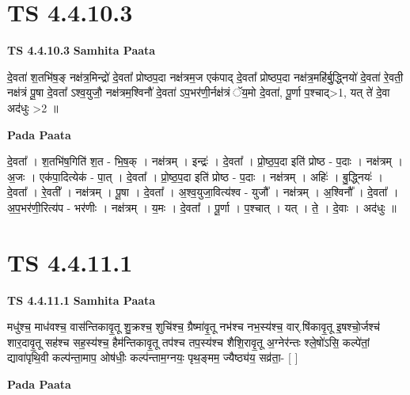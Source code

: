 \documentclass[17pt]{extarticle}
\begin{document}

\section{ TS 4.4.10.3 }

\textbf{TS 4.4.10.3 } \newline
\textbf{Samhita Paata} \newline

दे॒वता॑ श॒तभि॑ष॒ङ् नक्ष॑त्र॒मिन्द्रो॑ दे॒वता᳚ प्रोष्ठप॒दा नक्ष॑त्रम॒ज एक॑पाद् दे॒वता᳚ प्रोष्ठप॒दा नक्ष॑त्र॒महि॑र्बु॒द्ध्नियो॑ दे॒वता॑ रे॒वती॒ नक्ष॑त्रं पू॒षा दे॒वता᳚ ऽश्व॒युजौ॒ नक्ष॑त्रम॒श्विनौ॑ दे॒वता॑ ऽप॒भर॑णी॒र्नक्ष॑त्रं ॅय॒मो दे॒वता॑, पू॒र्णा प॒श्चाद्>1, यत् ते॑ दे॒वा अद॑धुः >2 ॥ \newline

\textbf{Pada Paata} \newline

दे॒वता᳚ । श॒तभि॑ष॒गिति॑ श॒त - भि॒ष॒क् । नक्ष॑त्रम् । इन्द्रः॑ । दे॒वता᳚ । प्रो॒ष्ठ॒प॒दा इति॑ प्रोष्ठ - प॒दाः । नक्ष॑त्रम् । अ॒जः । एक॑पा॒दित्येक॑ - पा॒त् । दे॒वता᳚ । प्रो॒ष्ठ॒प॒दा इति॑ प्रोष्ठ - प॒दाः । नक्ष॑त्रम् । अहिः॑ । बु॒द्ध्नियः॑ । दे॒वता᳚ । रे॒वती᳚ । नक्ष॑त्रम् । पू॒षा । दे॒वता᳚ । अ॒श्व॒युजा॒वित्य॑श्व - युजौ᳚ । नक्ष॑त्रम् । अ॒श्विनौ᳚ । दे॒वता᳚ । अ॒प॒भर॑णी॒रित्य॑प - भर॑णीः । नक्ष॑त्रम् । य॒मः । दे॒वता᳚ । पू॒र्णा । प॒श्चात् । यत् । ते॒ । दे॒वाः । अद॑धुः ॥  \newline





\section{ TS 4.4.11.1 }

\textbf{TS 4.4.11.1 } \newline
\textbf{Samhita Paata} \newline

मधु॑श्च॒ माध॑वश्च॒ वास॑न्तिकावृ॒तू शु॒क्रश्च॒ शुचि॑श्च॒ ग्रैष्मा॑वृ॒तू नभ॑श्च नभ॒स्य॑श्च॒ वार्.षि॑कावृ॒तू इ॒षश्चो॒र्जश्च॑ शार॒दावृ॒तू सह॑श्च सह॒स्य॑श्च॒ हैम॑न्तिकावृ॒तू तप॑श्च तप॒स्य॑श्च शैशि॒रावृ॒तू अ॒ग्नेर॑न्तः श्ले॒षो॑ऽसि॒ कल्पे॑तां॒ द्यावा॑पृथि॒वी कल्प॑न्ता॒माप॒ ओष॑धीः॒ कल्प॑न्ताम॒ग्नयः॒ पृथ॒ङ्मम॒ ज्यैष्ठ्य॑य॒ सव्र॑ता॒- [  ] \newline

\textbf{Pada Paata} \newline
\end{document}
